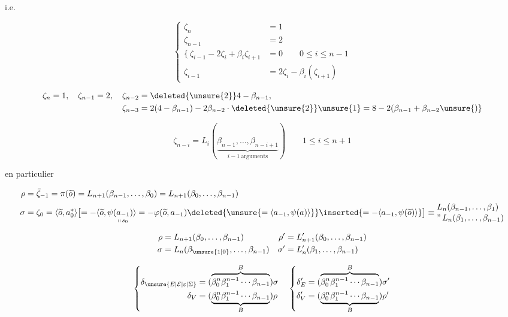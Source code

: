 i.e.

\[
\left\{\begin{aligned}
\zeta_n&=1\\
\zeta_{n-1}&=2\\
\{\ \zeta_{i-1}-2\zeta_i+\beta_i\zeta_{i+1}&=0\qquad 0\le i\le n-1\\
\zeta_{i-1}&=2\zeta_i-\beta_i(\zeta_{i+1})
\end{aligned}\right.
\]

\[
\begin{aligned}
\zeta_n=1,\quad \zeta_{n-1}=2,\quad \zeta_{n-2}&=\deleted{\unsure{2}}4-\beta_{n-1},\\
\zeta_{n-3}&=2(4-\beta_{n-1})-2\beta_{n-2}\cdot\deleted{\unsure{2}}\unsure{1}=8-2(\beta_{n-1}+\beta_{n-2}\unsure{)}
\end{aligned}
\]

\[
\boxed{\zeta_{n-i}=L_i(\underbrace{\beta_{n-1},\ldots,\beta_{n-i+1}}_{i-1\ \text{arguments}})}
\qquad 1\le i\le n+1
\]

en particulier

\[
\begin{aligned}
\rho&=\bar{\zeta}_{-1}=\pi(\widetilde{o})=L_{n+1}(\beta_{n-1},\ldots,\beta_0)=L_{n+1}(\beta_0,\ldots,\beta_{n-1})\\
\sigma&=\zeta_0=\langle\widetilde{o},a_0^*\rangle\bigl[=-\langle\widetilde{o},\psi(\underset{\shortparallel\,s_0}{a_{-1}})\rangle
=-\varphi(\widetilde{o},a_{-1})\deleted{\unsure{=\langle a_{-1},\psi(a)\rangle}}\inserted{=-\langle a_{-1},\psi(\widetilde{o})\rangle}\bigr]
\equiv \begin{aligned}&L_n(\beta_{n-1},\ldots,\beta_1)\\[-2pt]&\text{''}\,L_n(\beta_1,\ldots,\beta_{n-1})\end{aligned}
\end{aligned}
\]


\[
\begin{aligned}
\rho&=L_{n+1}(\beta_0,\ldots,\beta_{n-1})&\rho'&=L'_{n+1}(\beta_0,\ldots,\beta_{n-1})\\
\sigma&=L_n(\beta_{\unsure{1|0}},\ldots,\beta_{n-1})&\sigma'&=L'_n(\beta_1,\ldots,\beta_{n-1})
\end{aligned}
\]

\[
\left\{\begin{aligned}\delta_{\unsure{E|\mathcal E|\varepsilon|\Sigma}}&=(\overbrace{\beta_0^n\beta_1^{n-1}\cdots\beta_{n-1}}^B)\sigma\\
\delta_V&=(\underbrace{\beta_0^n\beta_1^{n-1}\cdots\beta_{n-1}}_B)\rho\end{aligned}\right.
\quad
\left\{\begin{aligned}\delta'_E&=(\overbrace{\beta_0^n\beta_1^{n-1}\cdots\beta_{n-1}}^B)\sigma'\\
\delta'_V&=(\underbrace{\beta_0^n\beta_1^{n-1}\cdots\beta_{n-1}}_B)\rho'\end{aligned}\right.
\]

